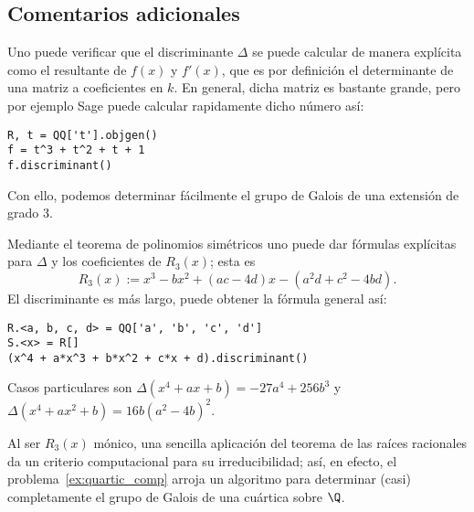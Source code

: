\documentclass[11pt, reqno]{amsart}
\begin{document}
\begin{additional}
\appendix
\section{Comentarios adicionales}
Uno puede verificar que el discriminante $\Delta$ se puede calcular de manera explícita como el resultante de $f(x)$ y $f'(x)$, que es por
definición el determinante de una matriz a coeficientes en $k$.
En general, dicha matriz es bastante grande, pero por ejemplo \textsf{Sage} puede calcular rapidamente dicho número así:
\begin{verbatim}
R, t = QQ['t'].objgen()
f = t^3 + t^2 + t + 1
f.discriminant()
\end{verbatim}
Con ello, podemos determinar fácilmente el grupo de Galois de una extensión de grado 3.

Mediante el teorema de polinomios simétricos uno puede dar fórmulas explícitas para $\Delta$ y los coeficientes de $R_3(x)$; esta es
\[
	R_3(x) := x^3 - bx^2 + (ac - 4d)x - (a^2d + c^2 - 4bd).
\]
El discriminante es más largo, puede obtener la fórmula general así:
\begin{verbatim}
R.<a, b, c, d> = QQ['a', 'b', 'c', 'd']
S.<x> = R[]
(x^4 + a*x^3 + b*x^2 + c*x + d).discriminant()
\end{verbatim}
Casos particulares son $\Delta(x^4 + ax + b) = -27a^4 + 256b^3$ y $\Delta(x^4 + ax^2 + b) = 16b(a^2 - 4b)^2$.

Al ser $R_3(x)$ mónico, una sencilla aplicación del teorema de las raíces racionales da un criterio computacional para su irreducibilidad;
así, en efecto, el problema~\ref{ex:quartic_comp} arroja un algoritmo para determinar (casi) completamente el grupo de Galois de una
cuártica sobre $\Q$.

\printbibliography
\end{additional}
\end{document}
